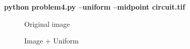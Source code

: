 \pagebreak
\begin{minipage}{\textwidth}
\textbf{python problem4.py --uniform --midpoint circuit.tif} \\
\end{minipage}

\begin{figure}[!htb]\centering
    \begin{minipage}{0.45\textwidth}
        \caption{\small{Original image}}
    \end{minipage}
    \begin{minipage}{0.45\textwidth}
        \caption{\small{Image + Uniform}}
    \end{minipage}
\end{figure}


